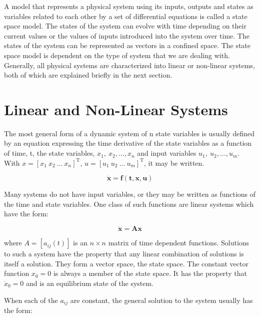 \documentclass{UoNMCHA}
\numberwithin{equation}{section}
\begin{document}
	A model that represents a physical system using its inputs, outputs and states as variables related to each other by a set of differential equations is called a state space model. The states of the system can evolve with time depending on their current values or the values of inputs introduced into the system over time. The states of the system can be represented as vectors in a confined space. The state space model is dependent on the type of system that we are dealing with. Generally, all physical systems are characterized into linear or non-linear systems, both of which are explained briefly in the next section.
	
	
	\section{Linear and Non-Linear Systems}\label{Linear and Non-Linear Systems}
	
	The most general form of a dynamic system of n state variables is usually defined by an equation expressing the time derivative of the state variables as a function of time, t, the state variables, $x_1\mathrm{,\ }x_2, …, x_n$ and input variables $u_1\mathrm{,\ }u_2, …, u_m$. With $x=\left[x_1\mathrm{\ } x_2\mathrm{\ } \ldots\mathrm{\ } x_n\right]^\mathrm{T}$, $u=\left[u_1\mathrm{\ } u_2\mathrm{\ } \ldots\mathrm{\ } u_m\right]^\mathrm{T}$, it may be written. 
	
	\begin{equation}
	\mathbf{\dot{x}=f(t,x,u)}
	\end{equation}
	
	Many systems do not have input variables, or they may be written as functions of the time and state variables. One class of such functions are linear systems which have the form:
	
	\begin{equation}
	\mathbf{\dot{x}=Ax}
	\end{equation}
	
	where $A=\left[a_{ij}(t)\right]$ is an $n\times n$ matrix of time dependent functions. Solutions to such a system have the property that any linear combination of solutions is itself a solution. They form a vector space, the state space. The constant vector function $x_0=0$ is always a member of the state space. It has the property that ${\dot{x}}_0=0$ and is an equilibrium state of the system.
	\newpage

	When each of the $a_{ij}$ are constant, the general solution to the system usually has the form: 
	
\end{document}
